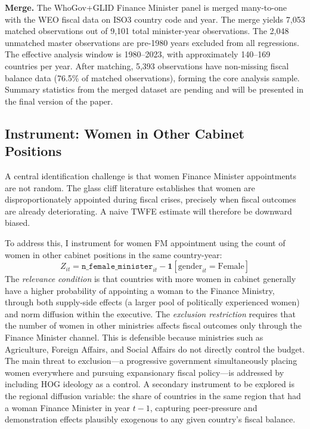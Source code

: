 \documentclass[12pt]{article}
\begin{document}
\textbf{Merge.} The WhoGov+GLID Finance Minister panel is merged many-to-one
with the WEO fiscal data on ISO3 country code and year. The merge yields 7,053
matched observations out of 9,101 total minister-year observations. The 2,048
unmatched master observations are pre-1980 years excluded from all regressions.
The effective analysis window is 1980--2023, with approximately 140--169
countries per year. After matching, 5,393 observations have non-missing fiscal
balance data (76.5\% of matched observations), forming the core analysis sample.
Summary statistics from the merged dataset are pending and will be presented in
the final version of the paper.

\subsection{Instrument: Women in Other Cabinet Positions}
\label{sec:instrument}

A central identification challenge is that women Finance Minister appointments
are not random. The glass cliff literature \citep{armstrong2024,kern2025}
establishes that women are disproportionately appointed during fiscal crises,
precisely when fiscal outcomes are already deteriorating. A naive TWFE estimate
will therefore be downward biased.

To address this, I instrument for women FM appointment using the count of women
in other cabinet positions in the same country-year:
\[
Z_{it} = \texttt{n\_female\_minister}_{it} - \mathbf{1}[\text{gender}_{it} = \text{Female}]
\]
The \textit{relevance condition} is that countries with more women in cabinet
generally have a higher probability of appointing a woman to the Finance
Ministry, through both supply-side effects (a larger pool of politically
experienced women) and norm diffusion within the executive. The
\textit{exclusion restriction} requires that the number of women in other
ministries affects fiscal outcomes only through the Finance Minister channel.
This is defensible because ministries such as Agriculture, Foreign Affairs,
and Social Affairs do not directly control the budget. The main threat to
exclusion---a progressive government simultaneously placing women everywhere
and pursuing expansionary fiscal policy---is addressed by including HOG ideology
as a control. A secondary instrument to be explored is the regional diffusion
variable: the share of countries in the same region that had a woman Finance
Minister in year $t-1$, capturing peer-pressure and demonstration effects
plausibly exogenous to any given country's fiscal balance.
\end{document}
